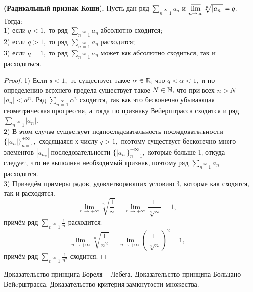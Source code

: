 \begin{theorem} \textbf{(Радикальный признак Коши).}
    Пусть дан ряд
    $\sum\limits_{n=1}\limits^{\infty}a_n$
    и $\operatorname*{\overline{lim}}\limits_{n\rightarrow\infty}
        \sqrt[n]{|a_n|}=q.$
    Тогда:\\
    1) если $q<1,$ то ряд
    $\sum\limits_{n=1}\limits^{\infty}a_n$
    абсолютно сходится;\\
    2) если $q>1,$ то ряд
    $\sum\limits_{n=1}\limits^{\infty}a_n$
    расходится;\\
    3) если $q=1,$ то ряд
    $\sum\limits_{n=1}\limits^{\infty}a_n$
    может как абсолютно сходиться, так и расходиться.
\end{theorem}
\begin{proof}
    1) Если $q<1,$ то существует такое
    $\alpha\in\mathbb{R},$ что $q<\alpha<1,$
    и по определению верхнего предела существует
    такое $N\in\mathbb{N},$ что при всех $n>N$
    $|a_n|<\alpha^n.$
    Ряд $\sum\limits_{n=1}\limits^{\infty}
        \alpha^n$ сходится, так как это бесконечно
    убывающая геометрическая прогрессия, а тогда
    по признаку Вейерштрасса сходится и ряд
    $\sum\limits_{n=1}\limits^{\infty}|a_n|.$\\
    2) В этом случае существует подпоследовательность
    последовательности $\{|a_n|\}_{n=1}^{+\infty},$
    сходящаяся к числу $q>1,$ поэтому существует
    бесконечно много элементов $|a_{n_k}|$
    последовательности $\{|a_n|\}_{n=1}^{+\infty},$
    которые больше 1, откуда следует, что
    не выполнен необходимый признак, поэтому ряд
    $\sum\limits_{n=1}\limits^{\infty}a_n$
    расходится.\\
    3) Приведём примеры рядов, удовлетворяющих
    условию 3, которые как сходятся, так и расходятся.
    $$
        \lim\limits_{n\rightarrow+\infty}\sqrt[n]{\frac{1}{n}}=
        \lim\limits_{n\rightarrow+\infty}\frac{1}{\sqrt[n]{n}}=1,
    $$
    причём ряд $\sum\limits_{n=1}\limits^{\infty}
        \frac{1}{n}$ расходится.
    $$
        \lim\limits_{n\rightarrow+\infty}\sqrt[n]{\frac{1}{n^2}}=
        \lim\limits_{n\rightarrow+\infty}\left(\frac{1}{\sqrt[n]{n}}\right)^2=1,
    $$
    причём ряд $\sum\limits_{n=1}\limits^{\infty}
        \frac{1}{n^2}$ сходится.
\end{proof}

\newpage
\begin{problem}
Доказательство принципа Бореля – Лебега. Доказательство принципа Больцано – Вейeрштрасса. Доказательство критерия замкнутости множества.
\end{problem}

